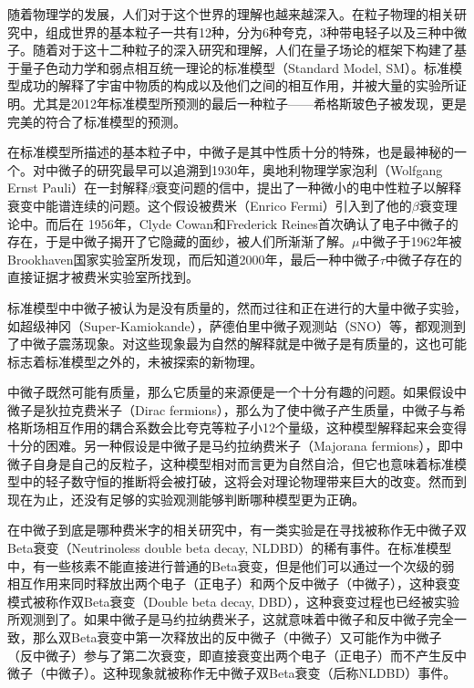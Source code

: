 
随着物理学的发展，人们对于这个世界的理解也越来越深入。在粒子物理的相关研究中，组成世界的基本粒子一共有12种，分为6种夸克，3种带电轻子以及三种中微子。随着对于这十二种粒子的深入研究和理解，人们在量子场论的框架下构建了基于量子色动力学和弱点相互统一理论的标准模型（Standard Model, SM）。标准模型成功的解释了宇宙中物质的构成以及他们之间的相互作用，并被大量的实验所证明。尤其是2012年标准模型所预测的最后一种粒子——希格斯玻色子被发现，更是完美的符合了标准模型的预测。

在标准模型所描述的基本粒子中，中微子是其中性质十分的特殊，也是最神秘的一个。对中微子的研究最早可以追溯到1930年，奥地利物理学家泡利（Wolfgang Ernst Pauli）在一封解释$\beta$衰变问题的信中，提出了一种微小的电中性粒子以解释衰变中能谱连续的问题。这个假设被费米（Enrico Fermi）引入到了他的$\beta$衰变理论中\supercite{wilson1968fermi}。而后在
1956年，Clyde Cowan和Frederick Reines首次确认了电子中微子的存在\supercite{cowan1991detection}，于是中微子揭开了它隐藏的面纱，被人们所渐渐了解。$\mu$中微子于1962年被Brookhaven国家实验室所发现\supercite{danby1962observation}，而后知道2000年，最后一种中微子$\tau$中微子存在的直接证据才被费米实验室所找到\supercite{kodama2001observation}。

标准模型中中微子被认为是没有质量的，然而过往和正在进行的大量中微子实验，如超级神冈（Super-Kamiokande）\supercite{fukuda1998evidence}，萨德伯里中微子观测站（SNO）\supercite{ahmad2002direct}等，都观测到了中微子震荡现象。对这些现象最为自然的解释就是中微子是有质量的，这也可能标志着标准模型之外的，未被探索的新物理。

中微子既然可能有质量，那么它质量的来源便是一个十分有趣的问题。如果假设中微子是狄拉克费米子（Dirac fermions），那么为了使中微子产生质量，中微子与希格斯场相互作用的耦合系数会比夸克等粒子小12个量级，这种模型解释起来会变得十分的困难。另一种假设是中微子是马约拉纳费米子（Majorana fermions），即中微子自身是自己的反粒子，这种模型相对而言更为自然自洽，但它也意味着标准模型中的轻子数守恒的推断将会被打破，这将会对理论物理带来巨大的改变。然而到现在为止，还没有足够的实验观测能够判断哪种模型更为正确。

在中微子到底是哪种费米字的相关研究中，有一类实验是在寻找被称作无中微子双Beta衰变（Neutrinoless double beta decay, NLDBD）\supercite{avignone2008double}的稀有事件。在标准模型中，有一些核素不能直接进行普通的Beta衰变，但是他们可以通过一个次级的弱相互作用来同时释放出两个电子（正电子）和两个反中微子（中微子），这种衰变模式被称作双Beta衰变（Double beta decay, DBD），这种衰变过程也已经被实验所观测到了。如果中微子是马约拉纳费米子，这就意味着中微子和反中微子完全一致，那么双Beta衰变中第一次释放出的反中微子（中微子）又可能作为中微子（反中微子）参与了第二次衰变，即直接衰变出两个电子（正电子）而不产生反中微子（中微子）。这种现象就被称作无中微子双Beta衰变（后称NLDBD）事件。

